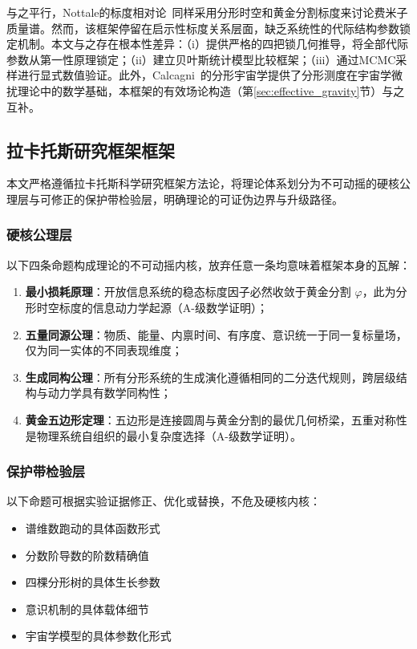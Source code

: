 \documentclass[12pt,a4paper,twocolumn]{article}
\renewcommand{\phi}{\varphi}
\begin{document}
与之平行，Nottale的标度相对论~\cite{Nottale1993, Nottale2011}同样采用分形时空和黄金分割标度来讨论费米子质量谱。然而，该框架停留在启示性标度关系层面，缺乏系统性的代际结构参数锁定机制。本文与之存在根本性差异：（i）提供严格的四把锁几何推导，将全部代际参数从第一性原理锁定；（ii）建立贝叶斯统计模型比较框架；（iii）通过MCMC采样进行显式数值验证。此外，Calcagni~\cite{Calcagni2010}的分形宇宙学提供了分形测度在宇宙学微扰理论中的数学基础，本框架的有效场论构造（第\ref{sec:effective_gravity}节）与之互补。

\subsection{拉卡托斯研究框架框架}
本文严格遵循拉卡托斯科学研究框架方法论，将理论体系划分为不可动摇的硬核公理层与可修正的保护带检验层，明确理论的可证伪边界与升级路径。

\subsubsection{硬核公理层}
以下四条命题构成理论的不可动摇内核，放弃任意一条均意味着框架本身的瓦解：
\begin{enumerate}
\item \textbf{最小损耗原理}：开放信息系统的稳态标度因子必然收敛于黄金分割 $\phi$，此为分形时空标度的信息动力学起源（A-级数学证明）；
\item \textbf{五量同源公理}：物质、能量、内禀时间、有序度、意识统一于同一复标量场，仅为同一实体的不同表现维度；
\item \textbf{生成同构公理}：所有分形系统的生成演化遵循相同的二分迭代规则，跨层级结构与动力学具有数学同构性；
\item \textbf{黄金五边形定理}：五边形是连接圆周与黄金分割的最优几何桥梁，五重对称性是物理系统自组织的最小复杂度选择（A-级数学证明）。
\end{enumerate}

\subsubsection{保护带检验层}
以下命题可根据实验证据修正、优化或替换，不危及硬核内核：
\begin{itemize}
\item 谱维数跑动的具体函数形式
\item 分数阶导数的阶数精确值
\item 四棵分形树的具体生长参数
\item 意识机制的具体载体细节
\item 宇宙学模型的具体参数化形式
\end{itemize}
\end{document}
